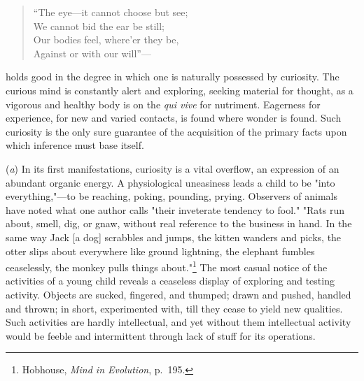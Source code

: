 \documentclass[showtrims,ustradepaper]{memoir}
\begin{document}
\begin{quote}
``The eye---it cannot choose but see;\\
We cannot bid the ear be still;\\
Our bodies feel, where'er they be,\\
Against or with our will''---
\end{quote}

holds good in the degree in which one is naturally possessed by
curiosity. The curious mind is constantly alert and exploring, seeking
material for thought, as a vigorous and healthy body is on the \emph{qui
vive} for nutriment. Eagerness for experience, for new and varied
contacts, is found where wonder is found. Such curiosity is the only
sure guarantee of the acquisition of the primary facts upon which
inference must base itself.


(\emph{a}) In its first manifestations, curiosity is a vital overflow,
an expression of an abundant organic energy. A physiological uneasiness
leads a child to be "into everything,"---to be reaching, poking,
pounding, prying. Observers of animals have noted what one author calls
"their inveterate tendency to fool." "Rats run about, smell, dig, or
gnaw, without real reference to the business in hand. In the same way
Jack {[}a dog{]} scrabbles and jumps, the kitten wanders and picks, the
otter slips about everywhere like ground lightning, the elephant fumbles
ceaselessly, the monkey pulls things
about."\footnote{Hobhouse, \emph{Mind in Evolution}, p.\ 195. }
The most casual notice of the activities of a young child reveals a
ceaseless display of exploring and testing activity. Objects are sucked,
fingered, and thumped; drawn and pushed, handled and thrown; in short,
experimented
with, till they cease to yield new qualities. Such activities are hardly
intellectual, and yet without them intellectual activity would be feeble
and intermittent through lack of stuff for its operations.

\end{document}
